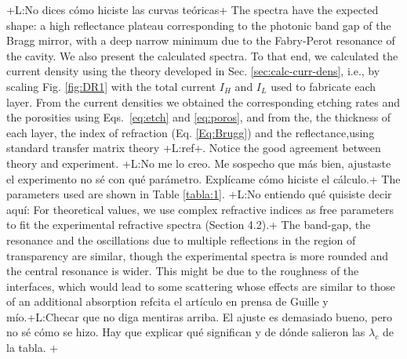 \documentclass{article}
\newcommand{\notaL}[1]{{\color{blue}+L:#1+}}
\begin{document}
\notaL{No dices cómo hiciste las curvas teóricas} The spectra have the
expected shape: a high reflectance plateau corresponding to the
photonic band gap of the Bragg mirror, with a deep narrow minimum due
to the Fabry-Perot resonance of the cavity. We also present the
calculated spectra. To that end, we calculated the current density
using the theory developed in Sec. \ref{sec:calc-curr-dens}, i.e., by
scaling Fig. \ref{fig:DR1} with the total current $I_H$ and $I_L$ used
to fabricate each layer. From the current densities we obtained the
corresponding etching rates and the porosities using
Eqs.~\eqref{eq:etch} and  \eqref{eq:poros}, and from the, the
thickness of each layer, the index of refraction
(Eq. \eqref{Eq:Brugg}) and the reflectance,using standard transfer
matrix theory \notaL{ref}. Notice the good agreement between theory
and experiment. \notaL{No me lo creo. Me sospecho que más bien,
  ajustaste el experimento no sé con qué parámetro. Explícame cómo
  hiciste el cálculo.} The parameters used are shown in Table \ref{tabla:1}.
\notaL{No entiendo qué quisiste decir aquí: For theoretical values, we
  use complex refractive indices as free parameters to fit the
  experimental refractive spectra (Section 4.2).} The band-gap, the
resonance and the oscillations due to multiple reflections in the
region of transparency are similar, though the experimental spectra is
more rounded and the central resonance is wider. This might be due to
the roughness of the interfaces, which would lead to some scattering
whose effects are similar to those of an additional absorption
ref{cita el artículo en prensa de Guille y mío}.\notaL{Checar que no
  diga mentiras arriba. El ajuste es demasiado bueno, pero no sé cómo
  se hizo. Hay que explicar qué significan y de dónde salieron las
  $\lambda_c$ de la tabla. }
\end{document}
